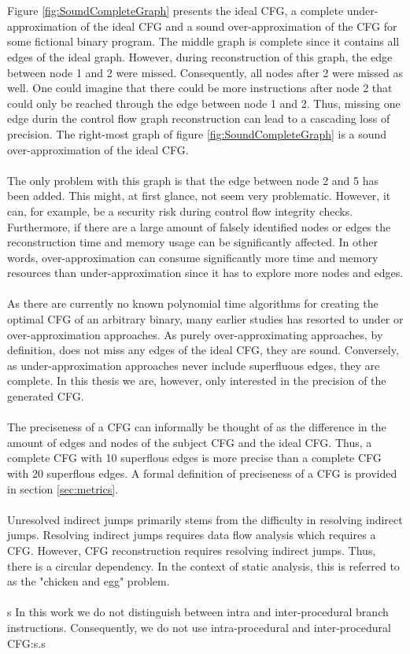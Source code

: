 \documentclass{kththesis}
\begin{document}
\\ \\
Figure \ref{fig:SoundCompleteGraph} presents the ideal CFG, a complete under-approximation of the ideal CFG and a sound over-approximation of the CFG for some fictional binary program. The middle graph is complete since it contains all edges of the ideal graph. However, during reconstruction of this graph, the edge between node 1 and 2 were missed. Consequently, all nodes after 2 were missed as well. One could imagine that there could be more instructions after node 2 that could only be reached through the edge between node 1 and 2. Thus, missing one edge durin the control flow graph reconstruction can lead to a cascading loss of precision. 
The right-most graph of figure \ref{fig:SoundCompleteGraph} is a sound over-approximation of the ideal CFG.
\\ \\
The only problem with this graph is that the edge between node 2 and 5 has been added. This might, at first glance, not seem very problematic. However, it can, for example, be a security risk during control flow integrity checks. Furthermore, if there are a large amount of falsely identified nodes or edges the reconstruction time and memory usage can be significantly affected. In other words, over-approximation can consume significantly more time and memory resources than under-approximation since it has to explore more nodes and edges\cite{alternating}.
\\ \\
As there are currently no known polynomial time algorithms for creating the optimal CFG of an arbitrary binary, many earlier studies has resorted to under or over-approximation approaches\cite{preciseCFGBoolean}. As purely over-approximating approaches, by definition, does not miss any edges of the ideal CFG, they are sound. Conversely, as under-approximation approaches never include superfluous edges, they are complete. In this thesis we are, however, only interested in the precision of the generated CFG.
\\ \\
The preciseness of a CFG can informally be thought of as the difference in the amount of edges and nodes of the subject CFG and the ideal CFG. Thus, a complete CFG with 10 superflous edges is more precise than a complete CFG with 20 superflous edges. A formal definition of preciseness of a CFG is provided in section \ref{sec:metrics}.
\\ \\
Unresolved indirect jumps primarily stems from the difficulty in resolving indirect jumps. Resolving indirect jumps requires data flow analysis which requires a CFG. However, CFG reconstruction requires resolving indirect jumps. Thus, there is a circular dependency. In the context of static analysis, this is referred to as the "chicken and egg" problem\cite{Jakstab}.
\\ \\s
In this work we do not distinguish between intra and inter-procedural branch instructions. Consequently, we do not use intra-procedural and inter-procedural CFG:s.s
\end{document}

